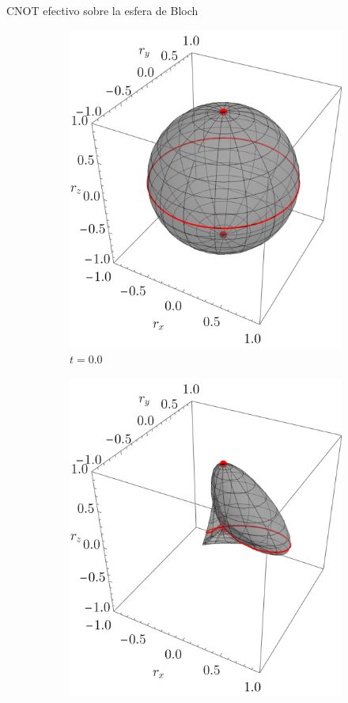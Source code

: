 \begin{frame}{CNOT efectivo sobre la esfera de Bloch}
    \begin{figure}[h!]
        \centering
        \begin{subfigure}{0.32\textwidth}
            \centering
            \includegraphics[width=0.9\linewidth]{figures/maxent_results/CNOT_p=0.5_t=0._r=0.9.png}
            \caption{$t=0.0$}
        \end{subfigure}%
        \begin{subfigure}{0.32\textwidth}
            \centering
            \includegraphics[width=0.9\linewidth]{figures/maxent_results/CNOT_p=0.5_t=1._r=0.9.png}

\end{subfigure}
\end{figure}
\end{frame}

